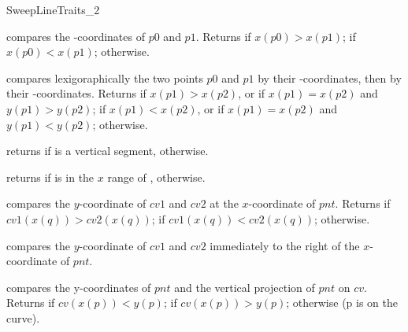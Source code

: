 \begin{ccRefConcept}{SweepLineTraits_2}
\ccOperations

  {compares the -coordinates of $p0$ and $p1$.  Returns
   if $x(p0) > x(p1)$;  if $x(p0) < x(p1)$;
   otherwise.}
    
  {compares lexigoraphically the two points $p0$ and $p1$ by their
  -coordinates, then by their -coordinates.
  Returns  if $x(p1) > x(p2)$, or if
  $x(p1) = x(p2)$ and $y(p1) > y(p2)$;
   if $x(p1) < x(p2)$, or if $x(p1) = x(p2)$ and
  $y(p1) < y(p2)$;
   otherwise.}

  {returns  if  is a vertical segment, 
   otherwise.}

  {returns  if  is in the $x$ range of
  ,  otherwise.}
    
  {compares the $y$-coordinate of $cv1$ and $cv2$ at the $x$-coordinate 
  of $pnt$. Returns  if $cv1(x(q)) > cv2(x(q))$;
   if $cv1(x(q)) < cv2(x(q))$;  otherwise.
  }

  {compares the $y$-coordinate of $cv1$ and $cv2$ immediately to the right of
  the $x$-coordinate of $pnt$.
  }

  {compares the y-coordinates of $pnt$ and the vertical projection of $pnt$
  on $cv$. Returns  if $cv(x(p)) < y(p)$; 
  if $cv(x(p)) > y(p)$;  otherwise (p is on the curve).
  }
          

\end{ccRefConcept}
